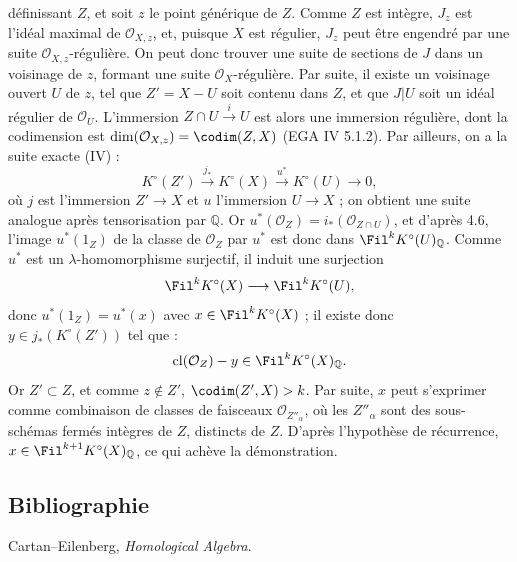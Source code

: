 définissant \(Z\), et soit \(z\) le point générique de \(Z\). Comme \(Z\) est intègre, \(J_z\) est l'idéal maximal de \(\mathcal O_{X,z}\), et, puisque \(X\) est régulier, \(J_z\) peut être engendré par une suite \(\mathcal O_{X,z}\)-régulière. On peut donc trouver une suite de sections de \(J\) dans un voisinage de \(z\), formant une suite \(\mathcal O_X\)-régulière. Par suite, il existe un voisinage ouvert \(U\) de \(z\), tel que \(Z'=X-U\) soit contenu dans \(Z\), et que \(J|U\) soit un idéal régulier de \(\mathcal O_U\). L'immersion \(Z\cap U\xrightarrow{i}U\) est alors une immersion régulière, dont la codimension est \(\dim(\mathcal O_{X,z})=\codim(Z,X)\) (EGA IV 5.1.2). Par ailleurs, on a la suite exacte (IV\qquad) :
\[
  K^\circ(Z')\xrightarrow{j_*}K^\circ(X)
  \xrightarrow{u^*}K^\circ(U)\to0,
\]
où \(j\) est l'immersion \(Z'\to X\) et \(u\) l'immersion \(U\to X\) ; on obtient une suite analogue après tensorisation par \(\mathbb Q\). Or \(u^*(\mathcal O_Z)=i_*(\mathcal O_{Z\cap U})\), et d'après 4.6, l'image \(u^*(1_Z)\) de la classe de \(\mathcal O_Z\) par \(u^*\) est donc dans \(\Fil^kK^\circ(U)_{\mathbb Q}\). Comme \(u^*\) est un \(\lambda\)-homomorphisme surjectif, il induit une surjection
\[
  \Fil^kK^\circ(X)\longrightarrow \Fil^kK^\circ(U),
\]
donc \(u^*(1_Z)=u^*(x)\) avec \(x\in\Fil^kK^\circ(X)\) ; il existe donc \(y\in j_*(K^\circ(Z'))\) tel que :
\[
  \operatorname{cl}(\mathcal O_Z)-y\in\Fil^kK^\circ(X)_{\mathbb Q}.
\]
Or \(Z'\subset Z\), et comme \(z\notin Z'\), \(\codim(Z',X)>k\). Par suite, \(x\) peut s'exprimer comme combinaison de classes de faisceaux \(\mathcal O_{Z''_\alpha}\), où les \(Z''_\alpha\) sont des sous-schémas fermés intègres de \(Z\), distincts de \(Z\). D'après l'hypothèse de récurrence, \(x\in\Fil^{k+1}K^\circ(X)_{\mathbb Q}\), ce qui achève la démonstration.

\subsection*{Bibliographie}
\begin{enumerate}[label={[\arabic*]}]
\item Cartan--Eilenberg, \emph{Homological Algebra}.
\end{enumerate}



\providecommand{\etale}{\'etale}
\providecommand{\Ch}{\operatorname{Ch}}



